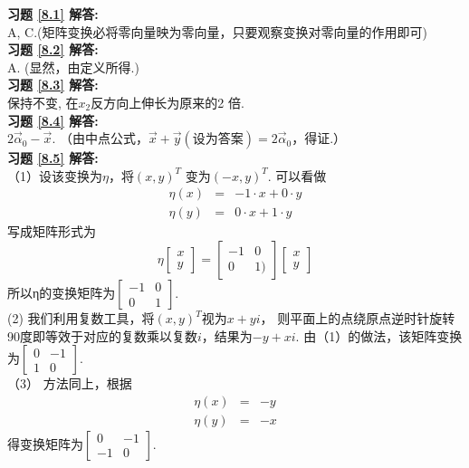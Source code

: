 \documentclass[a4paper]{book}
\begin{document}
\textbf{习题 \ref{8.1} 解答:}\\
A, C.(矩阵变换必将零向量映为零向量，只要观察变换对零向量的作用即可)\\
\textbf{习题 \ref{8.2} 解答:}\\
A. (显然，由定义所得.)\\
\textbf{习题 \ref{8.3} 解答:}\\
保持不变, 在$x_2$反方向上伸长为原来的2 倍.\\
\textbf{习题 \ref{8.4} 解答:}\\
$2\vec{\alpha}_0-\vec{x}$. （由中点公式，$\vec{x}+\vec{y}(\text{设为答案})=2\vec{\alpha}_0$，得证.）\\
\textbf{习题 \ref{8.5} 解答:}\\
（1）设该变换为$\eta$，将$(x,y)^T$ 变为$(-x,y)^T$. 可以看做
\begin{eqnarray*}
    \eta(x) &=& -1\cdot x+0\cdot y \\
    \eta(y) &=& 0\cdot x+1\cdot y
\end{eqnarray*}
写成矩阵形式为
\begin{equation*}
\eta\begin{bmatrix}x\\y\end{bmatrix}=
\begin{bmatrix}-1&0\\0&1)\end{bmatrix}
\begin{bmatrix}x\\y\end{bmatrix}
\end{equation*}
所以η的变换矩阵为$\begin{bmatrix}-1&0\\0&1\end{bmatrix}$.\\
(2) 我们利用复数工具，将$(x,y)^T$视为$x+yi$，
则平面上的点绕原点逆时针旋转90度即等效于对应的复数乘以复数$i$，结果为$-y+xi$.
由（1）的做法，该矩阵变换为$\begin{bmatrix}0&-1\\1&0\end{bmatrix}$.\\
（3） 方法同上，根据
\begin{eqnarray*}
    \eta(x) &=& - y \\
    \eta(y) &=& - x
\end{eqnarray*}
得变换矩阵为$\begin{bmatrix}0&-1\\-1&0\end{bmatrix}$.\\
\end{document}
